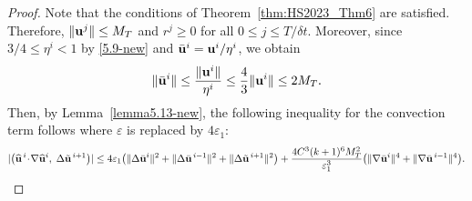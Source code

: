 \documentclass{article}
\theoremstyle{definition}                   %
\begin{document}
\begin{proof}
Note that the conditions of Theorem~\ref{thm:HS2023_Thm6} are satisfied. Therefore,
$\|{\bf u}^{j}\|\le M_T$ and $r^{j}\ge 0$ for all
$0\le j \le T/\delta t$. Moreover, since $3/4 \le \eta^i < 1$ by
\eqref{5.9-new} and $\bar{\bf u}^i={\bf u}^i/\eta^i$, we obtain
\begin{align}
\|\bar{\bf u}^i\|
\le \frac{\|{\bf u}^i\|}{\eta^i}
\le \frac{4}{3}\|{\bf u}^i\|
\le 2M_T.
\label{ubar_upperbound}
\end{align}
Then, by Lemma~\ref{lemma5.13-new}, the following inequality for  the convection term follows where $\varepsilon$ is replaced by $4\varepsilon_1$:
\begin{align}
|\bigl(\widehat {\bf u}^{\,i}\!\cdot\!\nabla \widehat {\bf u}^{i},\;\Delta\tilde {\bf u}^{\,i+1}\bigr)|
\le 
4\varepsilon_1 \big( \|\Delta\bar {\bf u}^i\|^2
+ \|\Delta\bar {\bf u}^{\,i-1}\|^2
+ \|\Delta\tilde {\bf u}^{\,i+1}\|^2 \big)
+  \frac{4C^3(k+1)^6 M_T^2}{\varepsilon_1^3} \big(\|\nabla\bar {\bf u}^i\|^4+\|\nabla\bar {\bf u}^{\,i-1}\|^4\big).
\label{5.13-new-use}
\end{align}


\end{proof}
\end{document}

